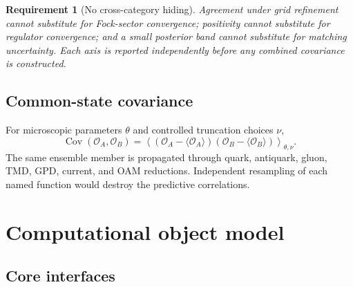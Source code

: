 \documentclass[11pt]{article}
\newtheorem{requirement}[definition]{Requirement}
\newcommand{\cO}{\mathcal O}
\begin{document}
\begin{requirement}[No cross-category hiding]
\label{req:no-cross-category-hiding}
Agreement under grid refinement cannot substitute for Fock-sector
convergence; positivity cannot substitute for regulator convergence; and a
small posterior band cannot substitute for matching uncertainty.  Each axis
is reported independently before any combined covariance is constructed.
\end{requirement}

\subsection{Common-state covariance}

For microscopic parameters \(\theta\) and controlled truncation choices
\(\nu\),
\begin{equation}
 \operatorname{Cov}(\cO_A,\cO_B)
 =\left\langle
 \left(\cO_A-\langle\cO_A\rangle\right)
 \left(\cO_B-\langle\cO_B\rangle\right)
 \right\rangle_{\theta,\nu}.
\label{eq:common-parent-covariance}
\end{equation}
The same ensemble member is propagated through quark, antiquark, gluon,
TMD, GPD, current, and OAM reductions.  Independent resampling of each named
function would destroy the predictive correlations.

\section{Computational object model}
\label{sec:software}

\subsection{Core interfaces}
\end{document}
